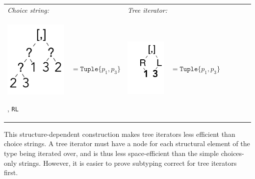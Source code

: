 \documentclass[a4paper,english]{lipics-v2019}
\newcommand{\xt}[1]{\texttt{#1}}
\renewcommand{\L}{{\tt L}\xspace}
\newcommand{\R}{{\tt R}\xspace}
\newcommand{\tuple}[1]{\xt{Tuple\{}#1\xt{\}}}
\begin{document}
\medskip
{\small
\begin{tabular}{@{}l@{~}ll@{~}ll@{~}ll@{~}l}
\it Choice string: &&  \multicolumn{2}{l}{\it Tree iterator:}\\[2mm]
\begin{minipage}{1.2cm}\includegraphics[scale=.25]{figures/tree1.pdf} 
\end{minipage} , \R\L & $ =   \tuple{p_1,p_3} $ 
&\begin{minipage}{1.2cm}\includegraphics[scale=.25]{figures/tree8.pdf}
\end{minipage}& $=\tuple{p_1,p_3}$
\end{tabular}}

\noindent
This structure-dependent construction makes tree iterators less efficient
than choice strings. A tree iterator must have a node for each structural
element of the type being iterated over, and is thus less space-efficient
than the simple choices-only strings. However, it is easier to prove
subtyping correct for tree iterators first.
\end{document}
